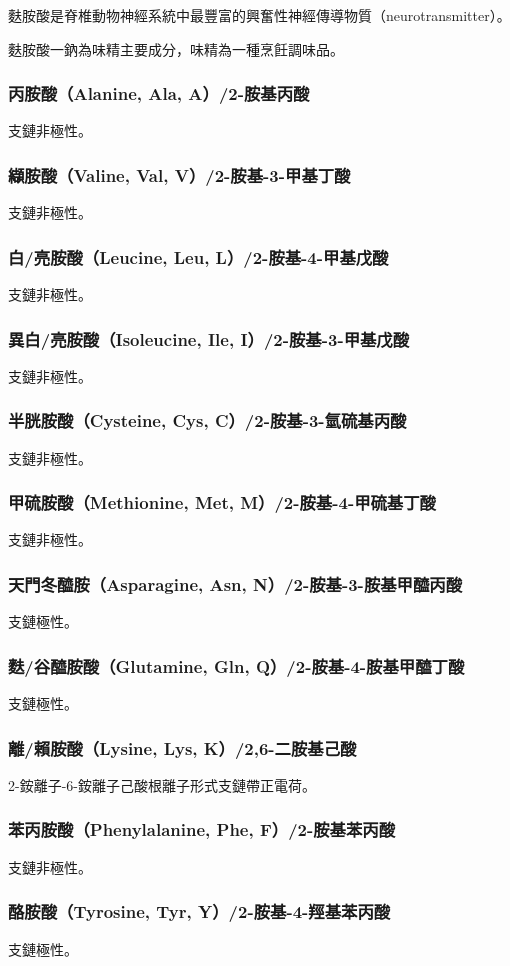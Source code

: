 \documentclass[a4paper,12pt]{report}
\begin{document}
\begin{itemize}
\begin{itemize}
麩胺酸是脊椎動物神經系統中最豐富的興奮性神經傳導物質（neurotransmitter）。

麩胺酸一鈉為味精主要成分，味精為一種烹飪調味品。
\subsubsection{丙胺酸（Alanine, Ala, A）/2-胺基丙酸}
支鏈非極性。
\subsubsection{纈胺酸（Valine, Val, V）/2-胺基-3-甲基丁酸}
支鏈非極性。
\subsubsection{白/亮胺酸（Leucine, Leu, L）/2-胺基-4-甲基戊酸}
支鏈非極性。
\subsubsection{異白/亮胺酸（Isoleucine, Ile, I）/2-胺基-3-甲基戊酸}
支鏈非極性。
\subsubsection{半胱胺酸（Cysteine, Cys, C）/2-胺基-3-氫硫基丙酸}
支鏈非極性。
\subsubsection{甲硫胺酸（Methionine, Met, M）/2-胺基-4-甲硫基丁酸}
支鏈非極性。
\subsubsection{天門冬醯胺（Asparagine, Asn, N）/2-胺基-3-胺基甲醯丙酸}
支鏈極性。
\subsubsection{麩/谷醯胺酸（Glutamine, Gln, Q）/2-胺基-4-胺基甲醯丁酸}
支鏈極性。
\subsubsection{離/賴胺酸（Lysine, Lys, K）/2,6-二胺基己酸}
2-銨離子-6-銨離子己酸根離子形式支鏈帶正電荷。
\subsubsection{苯丙胺酸（Phenylalanine, Phe, F）/2-胺基苯丙酸}
支鏈非極性。
\subsubsection{酪胺酸（Tyrosine, Tyr, Y）/2-胺基-4-羥基苯丙酸}
支鏈極性。

\end{itemize}
\end{itemize}
\end{document}

